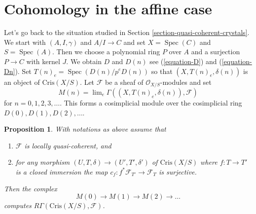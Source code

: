 \documentclass{stacks-project}
\theoremstyle{plain}
\newtheorem{proposition}[subsection]{Proposition}
\theoremstyle{definition}
\theoremstyle{remark}
\numberwithin{equation}{subsection}
\def\lim{\mathop{\mathrm{lim}}\nolimits}
\def\Spec{\mathop{\mathrm{Spec}}}
\begin{document}
\section{Cohomology in the affine case}
\label{section-cohomology-affine}

\noindent
Let's go back to the situation studied in
Section \ref{section-quasi-coherent-crystals}. We
start with $(A, I, \gamma)$ and $A/I \to C$ and set
$X = \Spec(C)$ and $S = \Spec(A)$. Then we choose
a polynomial ring $P$ over $A$ and a surjection $P \to C$ with
kernel $J$. We obtain $D$ and $D(n)$ see
(\ref{equation-D}) and (\ref{equation-Dn}).
Set $T(n)_e = \Spec(D(n)/p^eD(n))$ so that
$(X, T(n)_e, \delta(n))$ is an object of $\text{Cris}(X/S)$.
Let $\mathcal{F}$ be a sheaf of $\mathcal{O}_{X/S}$-modules and set
$$
M(n) = \lim_e \Gamma((X, T(n)_e, \delta(n)), \mathcal{F})
$$
for $n = 0, 1, 2, 3, \ldots$. This forms a cosimplicial module
over the cosimplicial ring $D(0), D(1), D(2), \ldots$.

\begin{proposition}
\label{proposition-compute-cohomology}
With notations as above assume that
\begin{enumerate}
\item $\mathcal{F}$ is locally quasi-coherent, and
\item for any morphism $(U, T, \delta) \to (U', T', \delta')$
of $\text{Cris}(X/S)$ where $f : T \to T'$ is a closed immersion
the map $c_f : f^*\mathcal{F}_{T'} \to \mathcal{F}_T$ is surjective.
\end{enumerate}
Then the complex
$$
M(0) \to M(1) \to M(2) \to \ldots
$$
computes $R\Gamma(\text{Cris}(X/S), \mathcal{F})$.
\end{proposition}
\end{document}
